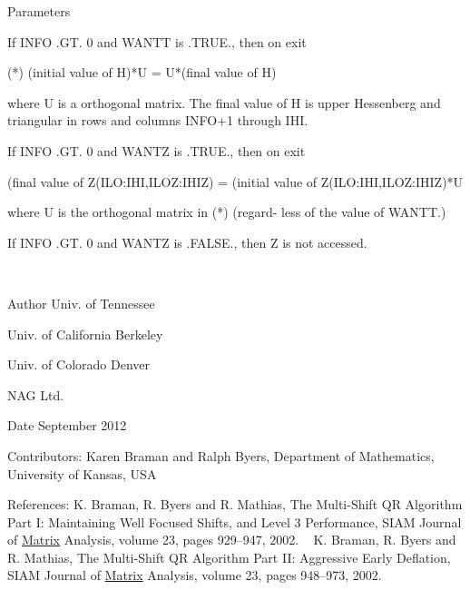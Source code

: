 \begin{DoxyParams}[1]{Parameters}
\begin{DoxyVerb}
                If INFO .GT. 0 and WANTT is .TRUE., then on exit

           (*)  (initial value of H)*U  = U*(final value of H)

                where U is a orthogonal matrix.  The final
                value of  H is upper Hessenberg and triangular in
                rows and columns INFO+1 through IHI.

                If INFO .GT. 0 and WANTZ is .TRUE., then on exit

                  (final value of Z(ILO:IHI,ILOZ:IHIZ)
                   =  (initial value of Z(ILO:IHI,ILOZ:IHIZ)*U

                where U is the orthogonal matrix in (*) (regard-
                less of the value of WANTT.)

                If INFO .GT. 0 and WANTZ is .FALSE., then Z is not
                accessed.\end{DoxyVerb}
 \\
\hline
\end{DoxyParams}
\begin{DoxyAuthor}{Author}
Univ. of Tennessee 

Univ. of California Berkeley 

Univ. of Colorado Denver 

N\+A\+G Ltd. 
\end{DoxyAuthor}
\begin{DoxyDate}{Date}
September 2012 
\end{DoxyDate}
\begin{DoxyParagraph}{Contributors\+: }
Karen Braman and Ralph Byers, Department of Mathematics, University of Kansas, U\+S\+A 
\end{DoxyParagraph}
\begin{DoxyParagraph}{References\+: }
K. Braman, R. Byers and R. Mathias, The Multi-\/\+Shift Q\+R Algorithm Part I\+: Maintaining Well Focused Shifts, and Level 3 Performance, S\+I\+A\+M Journal of \hyperlink{classMatrix}{Matrix} Analysis, volume 23, pages 929--947, 2002. ~\newline
 K. Braman, R. Byers and R. Mathias, The Multi-\/\+Shift Q\+R Algorithm Part I\+I\+: Aggressive Early Deflation, S\+I\+A\+M Journal of \hyperlink{classMatrix}{Matrix} Analysis, volume 23, pages 948--973, 2002. 
\end{DoxyParagraph}
